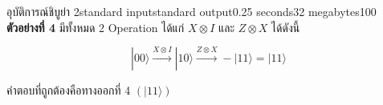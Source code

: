 \documentclass[11pt,a4paper]{article}
\begin{document}
\begin{problem}{อุบัติการณ์ชิบูย่า 2}{standard input}{standard output}{0.25 seconds}{32 megabytes}{100}
\textbf{ตัวอย่างที่ 4} มีทั้งหมด 2 Operation ได้แก่ $X \otimes I$ และ $Z \otimes X$ ได้ดังนี้

$$|00\rangle \xrightarrow{X \otimes I} |10\rangle \xrightarrow{Z \otimes X} -|11\rangle = |11\rangle$$

คำตอบที่ถูกต้องคือทางออกที่ 4 $(|11\rangle)$

\end{problem}
\end{document}
